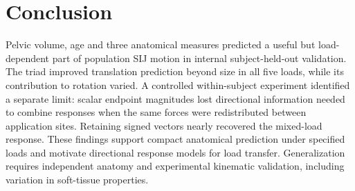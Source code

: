 \section{Conclusion}
Pelvic volume, age and three anatomical measures predicted a useful but load-dependent part of population SIJ motion in internal subject-held-out validation. The triad improved translation prediction beyond size in all five loads, while its contribution to rotation varied. A controlled within-subject experiment identified a separate limit: scalar endpoint magnitudes lost directional information needed to combine responses when the same forces were redistributed between application sites. Retaining signed vectors nearly recovered the mixed-load response. These findings support compact anatomical prediction under specified loads and motivate directional response models for load transfer. Generalization requires independent anatomy and experimental kinematic validation, including variation in soft-tissue properties.
